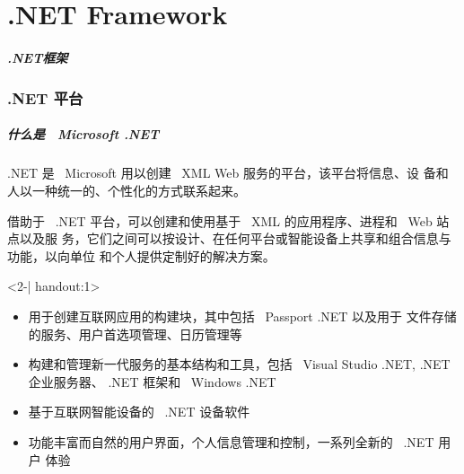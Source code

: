 
\part{.NET Framework}

\begin{frame}
\frametitle{.NET框架}
\tableofcontents
\end{frame}

\section{.NET 平台}
\begin{frame}
\frametitle{什么是 ~Microsoft .NET}

\CJKindent .NET 是 ~Microsoft 用以创建 ~XML Web 服务的平台，该平台将信息、设
备和人以一种统一的、个性化的方式联系起来。

\smallskip

借助于 ~.NET 平台，可以创建和使用基于 ~XML 的应用程序、进程和 ~Web 站点以及服
务，它们之间可以按设计、在任何平台或智能设备上共享和组合信息与功能，以向单位
和个人提供定制好的解决方案。



\begin{uncoverenv}<2-| handout:1>

  \begin{itemize}
  \item 用于创建互联网应用的构建块，其中包括 ~Passport .NET 以及用于
    文件存储的服务、用户首选项管理、日历管理等
  \item 构建和管理新一代服务的基本结构和工具，包括 ~Visual Studio .NET, .NET
    企业服务器、 .NET 框架和 ~Windows .NET
  \item 基于互联网智能设备的 ~.NET 设备软件
  \item 功能丰富而自然的用户界面，个人信息管理和控制，一系列全新的 ~.NET 用户
    体验
  \end{itemize}
\end{uncoverenv}


\end{frame}

